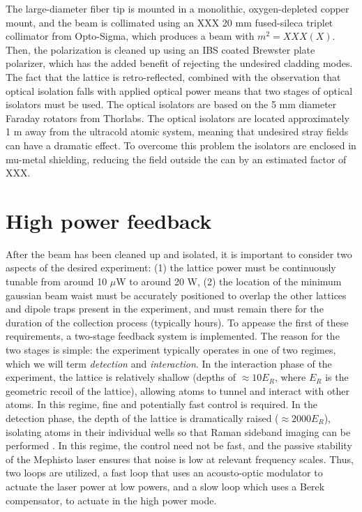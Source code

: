 \documentclass[twocolumn,aps,pra,showpacs,preprintnumbers,bibnotes]{revtex4-1}
\begin{document}
The large-diameter fiber tip is mounted in a monolithic, oxygen-depleted copper mount, and the beam is collimated using an XXX 20 mm fused-sileca triplet collimator from Opto-Sigma, which produces a beam with $m^2 = XXX(X)$.
Then, the polarization is cleaned up using an IBS coated Brewster plate polarizer, which has the added benefit of rejecting the undesired cladding modes. 
The fact that the lattice is retro-reflected, combined with the observation that optical isolation falls with applied optical power\cite{LIGO} means that two stages of optical isolators must be used. The optical isolators are based on the 5 mm diameter Faraday rotators from Thorlabs. 
The optical isolators are located approximately 1 m away from the ultracold atomic system, meaning that undesired stray fields can have a dramatic effect.
To overcome this problem the isolators are enclosed in mu-metal shielding, reducing the field outside the can by an estimated factor of XXX.

\section{High power feedback}

After the beam has been cleaned up and isolated, it is important to consider two aspects of the desired experiment: (1) the lattice power must be continuously tunable from around 10 $\mu$W to around 20 W, (2) the location of the minimum gaussian beam waist must be accurately positioned to overlap the other lattices and dipole traps present in the experiment, and must remain there for the duration of the collection process (typically hours).
To appease the first of these requirements, a two-stage feedback system is implemented. The reason for the two stages is simple: the experiment typically operates in one of two regimes, which we will term \textit{detection} and \textit{interaction}. 
In the interaction phase of the experiment, the lattice is relatively shallow (depths of $\approx 10 E_R$, where $E_R$ is the geometric recoil of the lattice), allowing atoms to tunnel and interact with other atoms. 
In this regime, fine and potentially fast control is required.
In the detection phase, the depth of the lattice is dramatically raised ($\approx 2000 E_R$), isolating atoms in their individual wells so that Raman sideband imaging can be performed \cite{parsons2015}.
In this regime, the control need not be fast, and the passive stability of the Mephisto laser ensures that noise is low at relevant frequency scales.
Thus, two loops are utilized, a fast loop that uses an acousto-optic modulator to actuate the laser power at low powers, and a slow loop which uses a Berek compensator, to actuate in the high power mode.
\end{document}
